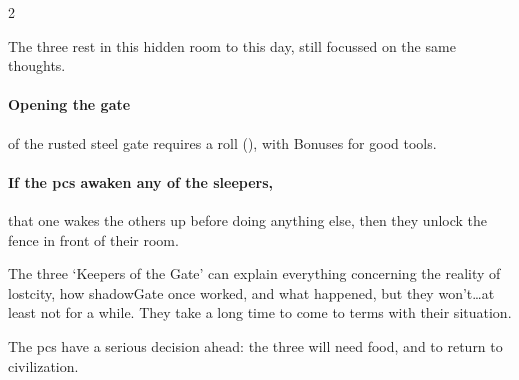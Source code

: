 \begin{multicols}{2}
\begin{exampletext}
  The three rest in this hidden room to this day, still focussed on the same thoughts.
\end{exampletext}

\paragraph{Opening the gate}
of the rusted steel gate requires a  roll (\tn[16]), with Bonuses for good tools.

\paragraph{If the \glspl{pc} awaken any of the sleepers,}
that one wakes the others up before doing anything else, then they unlock the fence in front of their room.

The three `Keepers of the Gate' can explain everything concerning the reality of \gls{lostcity}, how \gls{shadowGate} once worked, and what happened, but they won't\ldots at least not for a while.
They take a long time to come to terms with their situation.

The \glspl{pc} have a serious decision ahead: the three will need food, and to return to civilization.

\end{multicols}

